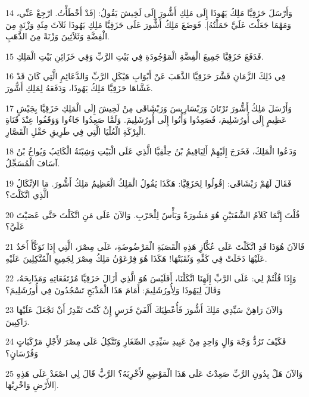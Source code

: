 \par 14 وَأَرْسَلَ حَزَقِيَّا مَلِكُ يَهُوذَا إِلَى مَلِكِ أَشُّورَ إِلَى لَخِيشَ يَقُولُ: [قَدْ أَخْطَأْتُ. ارْجِعْ عَنِّي، وَمَهْمَا جَعَلْتَ عَلَيَّ حَمَلْتُهُ]. فَوَضَعَ مَلِكُ أَشُّورَ عَلَى حَزَقِيَّا مَلِكِ يَهُوذَا ثَلاَثَ مِئَةِ وَزْنَةٍ مِنَ الْفِضَّةِ وَثَلاَثِينَ وَزْنَةً مِنَ الذَّهَبِ.
\par 15 فَدَفَعَ حَزَقِيَّا جَمِيعَ الْفِضَّةِ الْمَوْجُودَةِ فِي بَيْتِ الرَّبِّ وَفِي خَزَائِنِ بَيْتِ الْمَلِكِ.
\par 16 فِي ذَلِكَ الزَّمَانِ قَشَّرَ حَزَقِيَّا الذَّهَبَ عَنْ أَبْوَابِ هَيْكَلِ الرَّبِّ وَالدَّعَائِمِ الَّتِي كَانَ قَدْ غَشَّاهَا حَزَقِيَّا مَلِكُ يَهُوذَا، وَدَفَعَهُ لِمَلِكِ أَشُّورَ.
\par 17 وَأَرْسَلَ مَلِكُ أَشُّورَ تَرْتَانَ وَرَبْسَارِيسَ وَرَبْشَاقَى مِنْ لَخِيشَ إِلَى الْمَلِكِ حَزَقِيَّا بِجَيْشٍ عَظِيمٍ إِلَى أُورُشَلِيمَ، فَصَعِدُوا وَأَتُوا إِلَى أُورُشَلِيمَ. وَلَمَّا صَعِدُوا جَاءُوا وَوَقَفُوا عِنْدَ قَنَاةِ الْبِرْكَةِ الْعُلْيَا الَّتِي فِي طَرِيقِ حَقْلِ الْقَصَّارِ.
\par 18 وَدَعُوا الْمَلِكَ، فَخَرَجَ إِلَيْهِمْ أَلِيَاقِيمُ بْنُ حِلْقِيَّا الَّذِي عَلَى الْبَيْتِ وَشِبْنَةُ الْكَاتِبُ وَيُواخُ بْنُ آسَافَ الْمُسَجِّلُ.
\par 19 فَقَالَ لَهُمْ رَبْشَاقَى: [قُولُوا لِحَزَقِيَّا: هَكَذَا يَقُولُ الْمَلِكُ الْعَظِيمُ مَلِكُ أَشُّورَ. مَا الاِتِّكَالُ الَّذِي اتَّكَلْتَ؟
\par 20 قُلْتَ إِنَّمَا كَلاَمُ الشَّفَتَيْنِ هُوَ مَشُورَةٌ وَبَأْسٌ لِلْحَرْبِ. وَالآنَ عَلَى مَنِ اتَّكَلْتَ حَتَّى عَصَيْتَ عَلَيَّ؟
\par 21 فَالآنَ هُوَذَا قَدِ اتَّكَلْتَ عَلَى عُكَّازِ هَذِهِ الْقَصَبَةِ الْمَرْضُوضَةِ، عَلَى مِصْرَ، الَّتِي إِذَا تَوَكَّأَ أَحَدٌ عَلَيْهَا دَخَلَتْ فِي كَفِّهِ وَثَقَبَتْهَا! هَكَذَا هُوَ فِرْعَوْنُ مَلِكُ مِصْرَ لِجَمِيعِ الْمُتَّكِلِينَ عَلَيْهِ.
\par 22 وَإِذَا قُلْتُمْ لِي: عَلَى الرَّبِّ إِلَهِنَا اتَّكَلْنَا، أَفَلَيْسَ هُوَ الَّذِي أَزَالَ حَزَقِيَّا مُرْتَفَعَاتِهِ وَمَذَابِحَهُ، وَقَالَ لِيَهُوذَا وَلِأُورُشَلِيمَ: أَمَامَ هَذَا الْمَذْبَحِ تَسْجُدُونَ فِي أُورُشَلِيمَ؟
\par 23 وَالآنَ رَاهِنْ سَيِّدِي مَلِكَ أَشُّورَ فَأُعْطِيَكَ أَلْفَيْ فَرَسٍ إِنْ كُنْتَ تَقْدِرُ أَنْ تَجْعَلَ عَلَيْهَا رَاكِبِينَ.
\par 24 فَكَيْفَ تَرُدُّ وَجْهَ وَالٍ وَاحِدٍ مِنْ عَبِيدِ سَيِّدِي الصِّغَارِ وَتَتَّكِلُ عَلَى مِصْرَ لأَجْلِ مَرْكَبَاتٍ وَفُرْسَانٍ؟
\par 25 وَالآنَ هَلْ بِدُونِ الرَّبِّ صَعِدْتُ عَلَى هَذَا الْمَوْضِعِ لأَخْرِبَهُ؟ الرَّبُّ قَالَ لِي اصْعَدْ عَلَى هَذِهِ الأَرْضِ وَاخْرِبْهَا].
